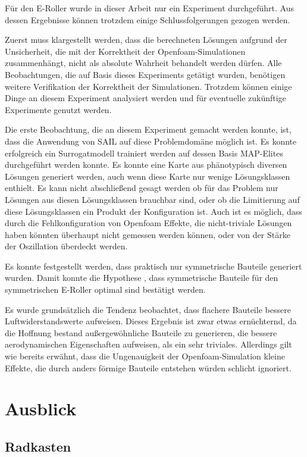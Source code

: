Für den E-Roller wurde in dieser Arbeit nur ein Experiment durchgeführt.
Aus dessen Ergebnisse können trotzdem einige Schlussfolgerungen gezogen werden.

Zuerst muss klargestellt werden, dass  die berechneten Lösungen aufgrund der Unsicherheit, die mit der Korrektheit der Openfoam-Simulationen zusammenhängt, nicht als absolute Wahrheit behandelt werden dürfen.
Alle Beobachtungen, die auf Basis dieses Experiments getätigt wurden, benötigen weitere Verifikation der Korrektheit der Simulationen.
Trotzdem können einige Dinge an diesem Experiment analysiert werden und für eventuelle zukünftige Experimente genutzt werden.

Die erste Beobachtung, die an diesem Experiment gemacht werden konnte, ist, dass die Anwendung von SAIL auf diese Problemdomäne möglich ist.
Es konnte erfolgreich ein Surrogatmodell trainiert werden auf dessen Basis MAP-Elites durchgeführt werden konnte.
Es konnte eine Karte aus phänotypisch diversen Lösungen generiert werden, auch wenn diese Karte nur wenige Lösungsklassen enthielt.
Es kann nicht abschließend gesagt werden ob für das Problem nur Lösungen aus diesen Lösungsklassen brauchbar sind, oder ob die Limitierung auf diese Lösungsklassen ein Produkt der Konfiguration ist.
Auch ist es möglich, dass durch die Fehlkonfiguration von Openfoam Effekte, die nicht-triviale Lösungen haben könnten überhaupt nicht gemessen werden können, oder von der Stärke der Oszillation überdeckt werden.

Es konnte festgestellt werden, dass praktisch nur symmetrische Bauteile generiert wurden.
Damit konnte die Hypothese , dass symmetrische Bauteile für den symmetrischen E-Roller optimal sind bestätigt werden.

Es wurde grundsätzlich die Tendenz beobachtet, dass flachere Bauteile bessere Luftwiderstandswerte aufweisen.
Dieses Ergebnis ist zwar etwas ernüchternd, da die Hoffnung bestand außergewöhnliche Bauteile zu generieren, die bessere aerodynamischen Eigenschaften aufweisen, als ein sehr triviales.
Allerdings gilt wie bereits erwähnt, dass die Ungenauigkeit der Openfoam-Simulation kleine Effekte, die durch anders förmige Bauteile entstehen würden schlicht ignoriert.

\section{Ausblick}

\subsection{Radkasten}

